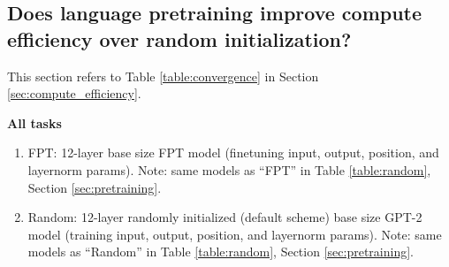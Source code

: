 \subsection{Does language pretraining improve compute efficiency over random initialization?}

This section refers to Table \ref{table:convergence} in Section \ref{sec:compute_efficiency}.

\textbf{All tasks}
\begin{enumerate}
    \item FPT: 12-layer base size FPT model (finetuning input, output, position, and layernorm params). Note: same models as ``FPT'' in Table \ref{table:random}, Section \ref{sec:pretraining}.
    \item Random: 12-layer randomly initialized (default scheme) base size GPT-2 model (training input, output, position, and layernorm params). Note: same models as ``Random'' in Table \ref{table:random}, Section \ref{sec:pretraining}.
\end{enumerate}
